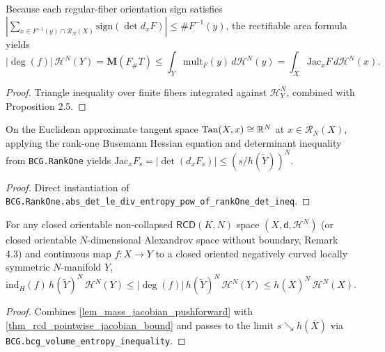 \begin{lemma}
\label{lem_mass_jacobian_pushforward}
\leanok
{}
Because each regular-fiber orientation sign satisfies $|\sum_{x \in F^{-1}(y) \cap \mathcal{R}_N(X)} \mathrm{sign}(\det d_x F)| \le \# F^{-1}(y)$, the rectifiable area formula yields
$$|\deg(f)|\,\mathcal{H}^N(Y) = \mathbf{M}(F_\# T) \le \int_Y \mathrm{mult}_F(y)\,d\mathcal{H}^N(y) = \int_X \mathrm{Jac}_x F \, d\mathcal{H}^N(x).$$
\end{lemma}
\begin{proof}\leanok Triangle inequality over finite fibers integrated against $\mathcal{H}^N_Y$, combined with Proposition 2.5.\end{proof}

\begin{theorem}
\label{thm_rcd_pointwise_jacobian_bound}
\leanok
{}
On the Euclidean approximate tangent space $\mathrm{Tan}(X, x) \cong \mathbb{R}^N$ at $x \in \mathcal{R}_N(X)$, applying the rank-one Busemann Hessian equation and determinant inequality from \texttt{BCG.RankOne} yields $\mathrm{Jac}_x F_s = |\det(d_x F_s)| \le (s / h(\widetilde{Y}))^N$.
\end{theorem}
\begin{proof}\leanok Direct instantiation of \texttt{BCG.RankOne.abs\_det\_le\_div\_entropy\_pow\_of\_rankOne\_det\_ineq}.\end{proof}

\begin{theorem}
\label{thm_rcd_entropy_degree_inequality}
\leanok
{}
For any closed orientable non-collapsed $\mathsf{RCD}(K, N)$ space $(X, \mathsf{d}, \mathcal{H}^N)$ (or closed orientable $N$-dimensional Alexandrov space without boundary, Remark 4.3) and continuous map $f : X \to Y$ to a closed oriented negatively curved locally symmetric $N$-manifold $Y$,
$$\mathrm{ind}_H(f)\,h(\widetilde{Y})^N\,\mathcal{H}^N(Y) \le |\deg(f)|\,h(\widetilde{Y})^N\,\mathcal{H}^N(Y) \le h(\overline{X})^N\,\mathcal{H}^N(X).$$
\end{theorem}
\begin{proof}\leanok Combines \cref{lem_mass_jacobian_pushforward} with \cref{thm_rcd_pointwise_jacobian_bound} and passes to the limit $s \searrow h(\overline{X})$ via \texttt{BCG.bcg\_volume\_entropy\_inequality}.\end{proof}

